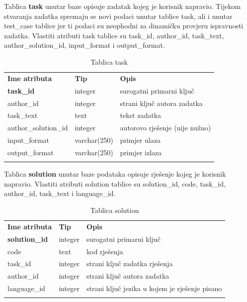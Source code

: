 \documentclass[times, utf8, zavrsni, numeric]{fer}
\begin{document}
		Tablica \textbf{task} unutar baze opisuje zadatak kojeg je korisnik napravio. Tijekom stvaranja zadatka spremaju se novi podaci unutar tablice task, ali i unutar test\_case tablice jer ti podaci su neophodni za dinamičku provjeru ispravnosti zadatka. Vlastiti atributi task tablice su task\_id, author\_id, task\_text, author\_solution\_id, input\_format i output\_format.
		\begin{table}[H]
			\caption{Tablica task}
			\label{tbl:task}
			\centering
			\begin{tabu} to \textwidth {XXX}
				\tabucline[1.75pt]{-}
				\textbf{Ime atributa} & \textbf{Tip} & \textbf{Opis}\\ 				
				\tabucline[1.75pt]{-}
				\textbf{task\_id} & integer & surogatni primarni ključ\\ \hline
				author\_id & integer & strani ključ autora zadatka\\ \hline
				task\_text & text & tekst zadatka\\ \hline
				author\_solution\_id & integer & autorovo rješenje (nije nužno)\\ \hline
				input\_format & varchar(250) & primjer ulaza\\ \hline
				output\_format & varchar(250) & primjer izlaza\\ \hline
				\tabucline[1.75pt]{-}
			\end{tabu}
		\end{table}
	

		Tablica \textbf{solution} unutar baze podataka opisuje rješenje  kojeg je korisnik napravio. Vlastiti atributi solution tablice su solution\_id, code, task\_id, author\_id, task\_text i language\_id.
		\begin{table}[H]
			\caption{Tablica solution}
			\label{tbl:solution}
			\centering
			\begin{tabu} to \textwidth {XXX}
				\tabucline[1.75pt]{-}
				\textbf{Ime atributa} & \textbf{Tip} & \textbf{Opis}\\ 				
				\tabucline[1.75pt]{-}
				\textbf{solution\_id} & integer & surogatni primarni ključ\\ \hline
				code & text & kod rješenja\\ \hline
				task\_id & integer & strani ključ zadatka rješenja\\ \hline
				author\_id & integer & strani ključ autora zadatka\\ \hline
				language\_id & integer & strani ključ jezika u kojem je rješenje pisano\\ \hline
				\tabucline[1.75pt]{-}
			\end{tabu}
		\end{table}
	
\end{document}
